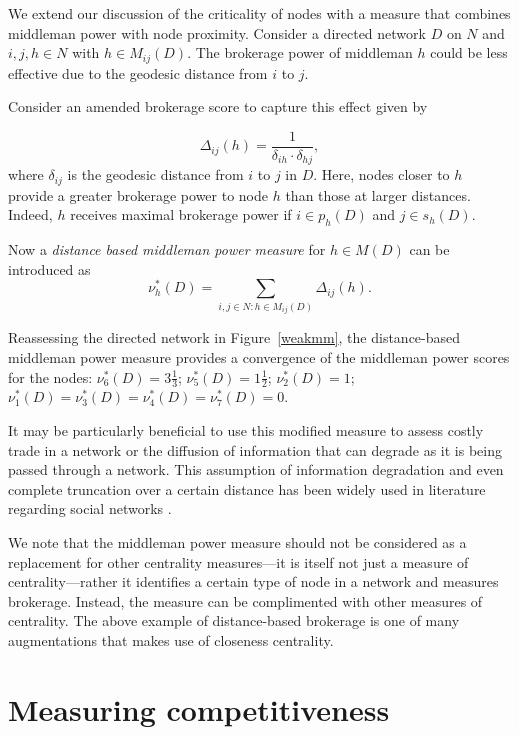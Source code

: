 We extend our discussion of the criticality of nodes with a measure that combines middleman power with node proximity. Consider a directed network $D$ on $N$ and $i,j,h \in N$ with $h \in M_{ij}(D)$. The brokerage power of middleman $h$ could be less effective due to the geodesic distance from $i$ to $j$.

Consider an amended brokerage score to capture this effect given by

\begin{equation}
\Delta_{ij}(h) = \frac{1}{\delta_{ih} \cdot \delta_{hj}},
\end{equation}
where $\delta_{ij}$ is the geodesic distance from $i$ to $j$ in $D$. Here, nodes closer to $h$ provide a greater brokerage power to node $h$ than those at larger distances. Indeed, $h$ receives maximal brokerage power if $i \in p_{h}(D)$ and $j \in s_{h}(D)$.

Now a \emph{distance based middleman power measure} for $h \in M(D)$ can be introduced as
\begin{equation}
\nu^{\ast}_h (D) = \sum_{i,j \in N \colon h \in M_{ij} (D)} \Delta_{ij} (h) .
\end{equation}

Reassessing the directed network in Figure~\ref{weakmm}, the distance-based middleman power measure provides a convergence of the middleman power scores for the nodes: $\nu^{\ast}_{6}(D) = 3 \frac{1}{3}$; $\nu^{\ast}_{5}(D) = 1 \frac{1}{2}$; $\nu^{\ast}_{2}(D) = 1$; $\nu^{\ast}_{1}(D) = \nu^{\ast}_{3}(D) = \nu^{\ast}_{4}(D) = \nu^{\ast}_{7}(D) = 0$.

It may be particularly beneficial to use this modified measure to assess costly trade in a network or the diffusion of information that can degrade as it is being passed through a network. This assumption of information degradation and even complete truncation over a certain distance has been widely used in literature regarding social networks \citep{JacksonRogers2005}.

\medskip \noindent We note that the middleman power measure should not be considered as a replacement for other centrality measures---it is itself not just a measure of centrality---rather it identifies a certain type of node in a network and measures brokerage. Instead, the measure can be complimented with other measures of centrality. The above example of distance-based brokerage is one of many augmentations that makes use of closeness centrality.

\section{Measuring competitiveness}


